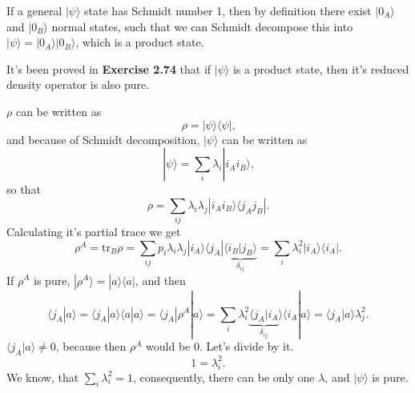 \documentclass[a4paper,12pt]{article}
\newcommand{\la}{\langle}
\newcommand{\ra}{\rangle}
\begin{document}
    If a general $| \psi \ra$ state has Schmidt number 1, then by definition there exist $| 0_A \ra$ and $| 0_B \ra$ normal states, such that we can Schmidt decompose this into $| \psi \ra = | 0_A \ra | 0_B \ra$, which is a product state.

    It's been proved in \textbf{Exercise 2.74} that if $| \psi \ra$ is a product state, then it's reduced density operator is also pure.

    $\rho$ can be written as
    \begin{equation}
        \rho = | \psi \ra \la \psi | \textrm{,}
    \end{equation}
    and because of Schmidt decomposition, $| \psi \ra$ can be written as
    \begin{equation}
        | \psi \ra = \sum_i \lambda_{i} | i_A i_B \ra \textrm{,}
    \end{equation}
    so that
    \begin{equation}
        \rho = \sum_{ij} \lambda_{i} \lambda_{j} | i_A i_B \ra \la j_A j_B | \textrm{.}
    \end{equation}
    Calculating it's partial trace we get
    \begin{equation}
        \rho^A = \textrm{tr}_B \rho =
        \sum_{ij} p_i \lambda_{i} \lambda_{j} | i_A \ra \la j_A | \underbrace{\la i_B | j_B \ra}_{\delta_{ij}} = \sum_{i} \lambda_{i}^2 | i_A \ra \la i_A | \textrm{.}
    \end{equation}
    If $\rho^A$ is pure, $| \rho^A \ra = | a \ra \la a |$, and then
    \begin{equation}
        \la j_A | a \ra = \la j_A | a \ra \la a | a \ra = \la j_A | \rho^A | a \ra = \sum_{i} \lambda_{i}^2 \underbrace{\la j_A | i_A}_{\delta_{ij}} \ra \la i_A | a \ra = \la j_A | a \ra \lambda_{j}^2 \textrm{.}
    \end{equation}
    $\la j_A | a \ra \neq 0$, because then $\rho^A$ would be 0. Let's divide by it.
    \begin{equation}
        1 = \lambda_{i}^2 \textrm{.}
    \end{equation}
    We know, that $\sum_i \lambda_i^2 = 1$, consequently, there can be only one $\lambda$, and $| \psi \ra$ is pure.
\end{document}
